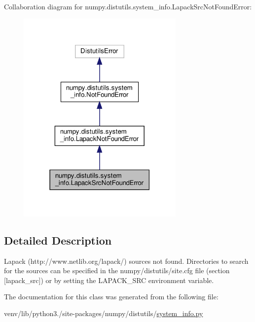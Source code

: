 Collaboration diagram for numpy.\+distutils.\+system\+\_\+info.\+Lapack\+Src\+Not\+Found\+Error\+:
\nopagebreak
\begin{figure}[H]
\begin{center}
\leavevmode
\includegraphics[width=231pt]{classnumpy_1_1distutils_1_1system__info_1_1LapackSrcNotFoundError__coll__graph}
\end{center}
\end{figure}


\subsection{Detailed Description}
\begin{DoxyVerb}Lapack (http://www.netlib.org/lapack/) sources not found.
Directories to search for the sources can be specified in the
numpy/distutils/site.cfg file (section [lapack_src]) or by setting
the LAPACK_SRC environment variable.\end{DoxyVerb}
 

The documentation for this class was generated from the following file\+:\begin{DoxyCompactItemize}
\item 
venv/lib/python3./site-\/packages/numpy/distutils/\hyperlink{system__info_8py}{system\+\_\+info.\+py}\end{DoxyCompactItemize}
